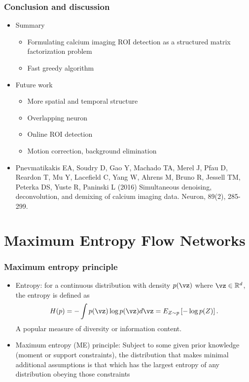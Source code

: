 \documentclass[16pt,presentation]{beamer}
\begin{document}
\begin{frame}
\frametitle{Conclusion and discussion}
\begin{itemize}
\item Summary
\begin{itemize}
\item Formulating calcium imaging ROI detection as a structured matrix factorization problem
\item Fast greedy algorithm
\end{itemize}
\item Future work
\begin{itemize}
\item More spatial and temporal structure
\item Overlapping neuron
\item Online ROI detection
\item Motion correction, background elimination
\end{itemize}
\item {\scriptsize Pnevmatikakis EA, Soudry D, \alert{Gao Y}, Machado TA, Merel J, Pfau D, Reardon T, Mu Y, Lacefield C, Yang W, Ahrens M, Bruno R, Jessell TM, Peterka DS, Yuste R, Paninski L (2016) Simultaneous denoising, deconvolution, and demixing of calcium imaging data. Neuron, 89(2), 285-299.}
\end{itemize}
\end{frame}


\section[]{Maximum Entropy Flow Networks}

\begin{frame}
\frametitle{Maximum entropy principle}
\begin{itemize}
\item \alert{Entropy}: for a continuous distribution with density $p(\vz)$ where $\vz \in \mathbb{R}^d$, the entropy is defined as
\[H(p) = - \int p(\vz) \log p(\vz)  d \vz = E_{Z \sim p} \left[ -\log p(Z) \right].\]
A popular measure of diversity or information content.
\item \alert{Maximum entropy (ME) principle}: Subject to some given prior knowledge (moment or support constraints), the distribution that makes \alert{minimal additional assumptions} is that which has the \alert{largest entropy} of any distribution obeying those constraints
\end{itemize}
\end{frame}
\end{document}
